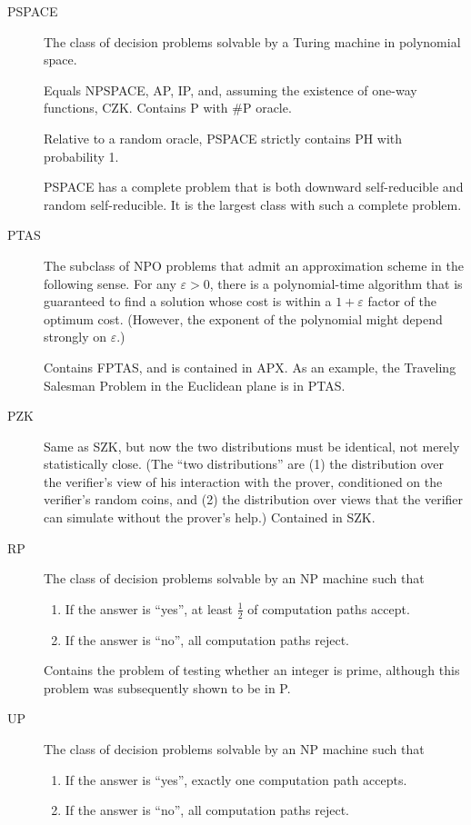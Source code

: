 \documentclass[a4paper]{article}
\newcommand{\cls}[1]{\rm{#1}}
\begin{document}
\begin{appendices}
\begin{description}
  \item[\cls{PSPACE}] The class of decision problems solvable by a Turing machine in polynomial space.

    Equals \cls{NPSPACE}, \cls{AP}, \cls{IP}, and, assuming the existence of one-way functions, \cls{CZK}.
    Contains \cls{P} with \cls{\#P} oracle.

    Relative to a random oracle, \cls{PSPACE} strictly contains \cls{PH} with probability 1.

    \cls{PSPACE} has a complete problem that is both downward self-reducible and random self-reducible.  It is the largest class with such a complete problem.

  \item[\cls{PTAS}] The subclass of \cls{NPO} problems that admit an approximation scheme in the following sense.  For any $\varepsilon > 0$, there is a polynomial-time algorithm that is guaranteed to find a solution whose cost is within a $1 + \varepsilon$ factor of the optimum cost.  (However, the exponent of the polynomial might depend strongly on $\varepsilon$.)

    Contains FPTAS, and is contained in APX.
    As an example, the Traveling Salesman Problem in the Euclidean plane is in PTAS.

  \item[\cls{PZK}] Same as \cls{SZK}, but now the two distributions must be identical, not merely statistically close.  (The ``two distributions'' are (1) the distribution over the verifier's view of his interaction with the prover, conditioned on the verifier's random coins, and (2) the distribution over views that the verifier can simulate without the prover's help.) Contained in SZK.

  \item[\cls{RP}] The class of decision problems solvable by an \cls{NP} machine such that
    \begin{enumerate}
      \item If the answer is ``yes'', at least $\frac12$ of computation paths accept.
      \item If the answer is ``no'', all computation paths reject.
    \end{enumerate}

    Contains the problem of testing whether an integer is prime, although this problem was subsequently shown to be in \cls{P}.

  \item[\cls{UP}] The class of decision problems solvable by an NP machine such that
    \begin{enumerate}
      \item If the answer is ``yes'', exactly one computation path accepts.
      \item If the answer is ``no'', all computation paths reject.
    \end{enumerate}


\end{description}
\end{appendices}
\end{document}
